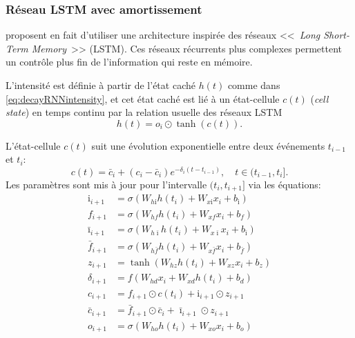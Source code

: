 \documentclass[../main.tex]{subfiles}
\begin{document}
\subsubsection{Réseau LSTM avec amortissement}

\citeauthor{meiEisnerNeuralHawkes} proposent en fait d'utiliser une architecture inspirée des réseaux <<~\textit{Long Short-Term Memory}~>> (LSTM). Ces réseaux récurrents plus complexes permettent un contrôle plus fin de l'information qui reste en mémoire.

L'intensité est définie à partir de l'état caché $h(t)$ comme dans \eqref{eq:decayRNNintensity}, et cet état caché est lié à un état-cellule $c(t)$ (\textit{cell state}) en temps continu par la relation usuelle des réseaux LSTM
\begin{equation}
	h(t) = o_i \odot \tanh(c(t)).
\end{equation}

L'état-cellule $c(t)$ suit une évolution exponentielle entre deux événements $t_{i-1}$ et $t_i$:
\begin{equation}\label{eq:ctlstmCellState}
c(t) = \bar{c}_{i} + (c_{i} - \bar{c}_{i})e^{-\delta_i (t - t_{i-1})},\quad t\in(t_{i-1}, t_{i}].
\end{equation}
Les paramètres sont mis à jour pour l'intervalle $(t_i, t_{i+1}]$ via les équations:
\begin{subequations}
\begin{align}
	\mathrm{i}_{i+1} &= \sigma(W_{h\mathrm{i}}h(t_i) + W_{x\mathrm{i}}x_i + b_{\mathrm{i}}) \\
	f_{i+1} &= \sigma(W_{hf}h(t_i) + W_{xf}x_i + b_{f}) \\
	\bar{\imath}_{i+1} &= \sigma(W_{h\bar{\imath}}h(t_i) + W_{x\bar{\imath}}x_i + b_{\bar{\imath}}) \\
	\bar{f}_{i+1} &= \sigma(W_{h\bar{f}}h(t_i) + W_{x\bar{f}}x_i + b_{\bar{f}}) \\
	z_{i+1} &= \tanh(W_{hz}h(t_i) + W_{xz}x_i + b_{z}) \\
	\delta_{i+1} &= f(W_{hd}x_i + W_{xd}h(t_i) + b_d) \\
	c_{i+1} &= f_{i+1}\odot c(t_i) + \mathrm{i}_{i+1}\odot z_{i+1} \\
	\bar{c}_{i+1} &= \bar{f}_{i+1}\odot \bar{c}_i + \bar{\imath}_{i+1}\odot z_{i+1} \\
	o_{i+1} &= \sigma(W_{ho}h(t_i) + W_{xo}x_i + b_o)
\end{align}
\end{subequations}
\end{document}
